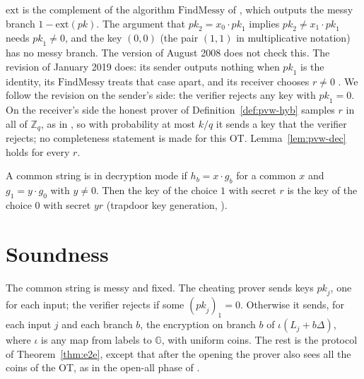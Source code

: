 \begin{remark}
  $\mathrm{ext}$ is the complement of the algorithm $\mathrm{FindMessy}$ of
  \cite[Sect.~5.3]{PVW08}, which outputs the messy branch $1 - \mathrm{ext}(\mathit{pk})$. The argument that $\mathit{pk}_2 = x_0 \cdot
  \mathit{pk}_1$ implies $\mathit{pk}_2 \neq x_1 \cdot \mathit{pk}_1$ needs $\mathit{pk}_1 \neq 0$,
  and the key $(0, 0)$ (the pair $(1, 1)$ in multiplicative notation) has no messy branch. The
  version of August 2008 does not check this. The revision of January 2019 does: its sender outputs
  nothing when $\mathit{pk}_1$ is the identity, its $\mathrm{FindMessy}$ treats that case apart, and
  its receiver chooses $r \neq 0$ \cite[Sect.~5.3]{PVW08}. We follow the revision on the sender's
  side: the verifier rejects any key with $\mathit{pk}_1 = 0$. On the receiver's side the honest
  prover of Definition~\ref{def:pvw-hyb} samples $r$ in all of $\mathbb{Z}_q$, as in
  \cite[App.~A]{JKO13}, so with probability at most $k/q$ it sends a key that the verifier rejects;
  no completeness statement is made for this OT. Lemma~\ref{lem:pvw-dec} holds for every $r$.
\end{remark}

\begin{definition}
  \label{def:pvw-dec}
  \leanok
  A common string is in decryption mode if $h_b = x \cdot g_b$ for a common $x$ and
  $g_1 = y \cdot g_0$ with $y \neq 0$.
  Then the key of the choice $1$ with secret $r$ is the key of the choice $0$ with secret $y r$
  (trapdoor key generation, \cite[Sect.~5.3]{PVW08}).
\end{definition}

\section{Soundness}

\begin{definition}
  \label{def:pvw-prover}
  \leanok
  The common string is messy and fixed. The cheating prover sends keys $\mathit{pk}_j$, one for
  each input; the verifier rejects if some $(\mathit{pk}_j)_1 = 0$. Otherwise it sends, for each
  input $j$ and each branch $b$, the encryption on branch $b$ of $\iota(L_j + b\Delta)$, where
  $\iota$ is any map from labels to $\mathbb{G}$, with uniform coins. The rest is the protocol of
  Theorem~\ref{thm:e2e}, except that after the opening the prover also sees all the coins of the
  OT, as in the open-all phase of \cite[Appendix~A]{JKO13}.
\end{definition}

